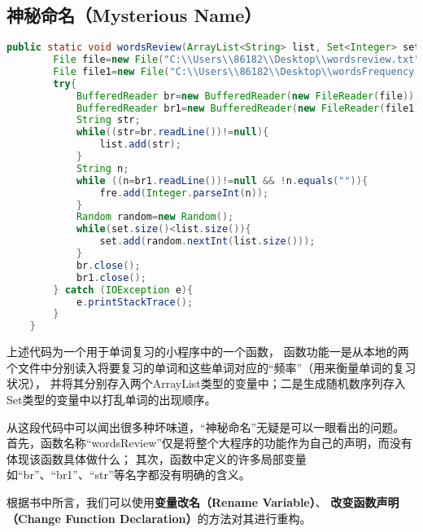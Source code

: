 \documentclass[a4paper]{article}
\begin{document}
\subsection{神秘命名（Mysterious Name）}
\begin{lstlisting}[language={java}]
    public static void wordsReview(ArrayList<String> list, Set<Integer> set, ArrayList<Integer> fre){
        File file=new File("C:\\Users\\86182\\Desktop\\wordsreview.txt");
        File file1=new File("C:\\Users\\86182\\Desktop\\wordsFrequency.txt");
        try{
            BufferedReader br=new BufferedReader(new FileReader(file));
            BufferedReader br1=new BufferedReader(new FileReader(file1));
            String str;
            while((str=br.readLine())!=null){
                list.add(str);
            }
            String n;
            while ((n=br1.readLine())!=null && !n.equals("")){
                fre.add(Integer.parseInt(n));
            }
            Random random=new Random();
            while(set.size()<list.size()){
                set.add(random.nextInt(list.size()));
            }
            br.close();
            br1.close();
        } catch (IOException e){
            e.printStackTrace();
        }
    }
\end{lstlisting}

上述代码为一个用于单词复习的小程序中的一个函数，
函数功能一是从本地的两个文件中分别读入将要复习的单词和这些单词对应的“频率”（用来衡量单词的复习状况），
并将其分别存入两个ArrayList类型的变量中；二是生成随机数序列存入Set类型的变量中以打乱单词的出现顺序。

从这段代码中可以闻出很多种坏味道，“神秘命名”无疑是可以一眼看出的问题。
首先，函数名称“wordsReview”仅是将整个大程序的功能作为自己的声明，而没有体现该函数具体做什么；
其次，函数中定义的许多局部变量如“br”、“br1”、“str”等名字都没有明确的含义。

根据书中所言，我们可以使用\textbf{变量改名（Rename Variable）}、
\textbf{改变函数声明（Change Function Declaration）}的方法对其进行重构。
\end{document}
